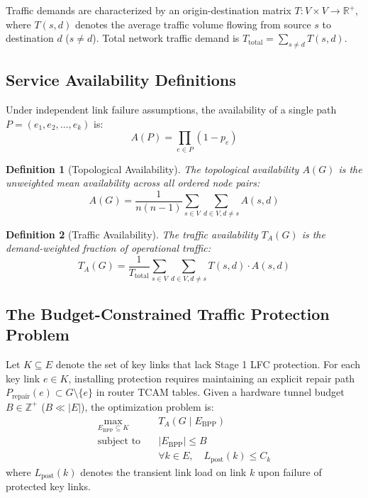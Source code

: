 \documentclass[journal]{IEEEtran}
\newtheorem{definition}{Definition}
\begin{document}
Traffic demands are characterized by an origin-destination matrix $T: V \times V \to \mathbb{R}^+$, where $T(s, d)$ denotes the average traffic volume flowing from source $s$ to destination $d$ ($s \ne d$). Total network traffic demand is $T_{\text{total}} = \sum_{s \ne d} T(s, d)$.

\subsection{Service Availability Definitions}
Under independent link failure assumptions, the availability of a single path $P = (e_1, e_2, \dots, e_k)$ is:
\begin{equation}
A(P) = \prod_{e \in P} (1 - p_e)
\end{equation}

\begin{definition}[Topological Availability]
The topological availability $A(G)$ is the unweighted mean availability across all ordered node pairs:
\begin{equation}
A(G) = \frac{1}{n(n-1)} \sum_{s \in V} \sum_{d \in V, d \ne s} A(s, d)
\end{equation}
\end{definition}

\begin{definition}[Traffic Availability]
The traffic availability $T_A(G)$ is the demand-weighted fraction of operational traffic:
\begin{equation}
T_A(G) = \frac{1}{T_{\text{total}}} \sum_{s \in V} \sum_{d \in V, d \ne s} T(s, d) \cdot A(s, d)
\end{equation}
\end{definition}

\subsection{The Budget-Constrained Traffic Protection Problem}
Let $K \subseteq E$ denote the set of key links that lack Stage 1 LFC protection. For each key link $e \in K$, installing protection requires maintaining an explicit repair path $P_{\text{repair}}(e) \subset G \setminus \{e\}$ in router TCAM tables. Given a hardware tunnel budget $B \in \mathbb{Z}^+$ ($B \ll |E|$), the optimization problem is:
\begin{align}
\max_{E_{\text{BPP}} \subseteq K} \quad & T_A(G \mid E_{\text{BPP}}) \label{eq:opt_obj} \\
\text{subject to} \quad & |E_{\text{BPP}}| \le B \label{eq:opt_budget} \\
& \forall k \in E, \quad L_{\text{post}}(k) \le C_k \label{eq:opt_cap}
\end{align}
where $L_{\text{post}}(k)$ denotes the transient link load on link $k$ upon failure of protected key links.
\end{document}
